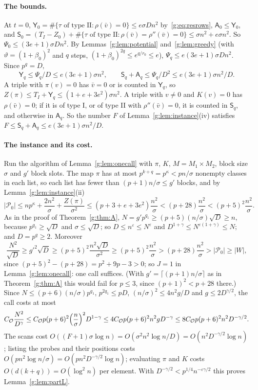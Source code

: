 \documentclass[11pt]{article}
\theoremstyle{definition}
\theoremstyle{remark}
\newcommand{\eps}{\varepsilon}
\newcommand{\Pq}{\mathcal{P}}
\begin{document}
\paragraph{The bounds.} At $t=0$, $\mathsf Y_0=\#\{\tau\text{ of type II}:\rho(\bar v)=0\}\le e\sigma Dn^2$ by~\eqref{g:eq:resrows}, $\mathsf A_0\le\mathsf Y_0$, and $\mathsf S_0=(T_I-Z_0)+\#\{\tau\text{ of type II}:\rho(\bar v)=\rho''(\bar v)=0\}\le\sigma n^2+e\sigma n^2$. So $\Psi_0\le(3e+1)\sigma Dn^2$. By Lemmas~\ref{g:lem:potential} and~\ref{g:lem:greedy} (with $\vartheta=(1+\beta_0)^2$ and $q$ steps, $(1+\beta_0)^{2q}\le e^{q/r_0}\le e$), $\Psi_q\le e(3e+1)\sigma Dn^2$. Since $p^q=D$,
\[
\mathsf Y_q\le\Psi_q/D\le e(3e+1)\sigma n^2,\qquad\mathsf S_q+\mathsf A_q\le\Psi_q/D^2\le e(3e+1)\sigma n^2/D .
\]
A triple with $\pi(v)=0$ has $\bar v=0$ or is counted in $\mathsf Y_q$, so $Z(\pi)\le T_I+\mathsf Y_q\le(1+e+3e^2)\sigma n^2$. A triple with $v\ne0$ and $K(v)=0$ has $\rho(\bar v)=0$; if it is of type I, or of type II with $\rho''(\bar v)=0$, it is counted in $\mathsf S_q$, and otherwise in $\mathsf A_q$. So the number $F$ of Lemma~\ref{g:lem:instance}(iv) satisfies $F\le\mathsf S_q+\mathsf A_q\le e(3e+1)\sigma n^2/D$.

\paragraph{The instance and its cost.} Run the algorithm of Lemma~\ref{g:lem:onecall} with $\pi$, $K$, $M=M_1\times M_2$, block size $\sigma$ and $g'$ block slots. The map $\pi$ has at most $p^{k+q}=p^\kappa<pn/\sigma$ nonempty classes in each list, so each list has fewer than $(p+1)n/\sigma\le g'$ blocks, and by Lemma~\ref{g:lem:instance}(ii)
\[
|\Pq_0|\le np^\kappa+\frac{2n^2}\sigma+\frac{Z(\pi)}{\sigma^2}\le(p+3+e+3e^2)\frac{n^2}\sigma<(p+28)\frac{n^2}\sigma<(p+5)^2\frac{n^2}\sigma .
\]
As in the proof of Theorem~\ref{g:thm:A}, $N=g'p^{q_1}\ge(p+5)(n/\sigma)\sqrt D\ge n$, because $p^{q_1}\ge\sqrt D$ and $\sigma\le\sqrt D$; so $D\le n^\eps\le N^\eps$ and $D^{1+\gamma}\le N^{\eps(1+\gamma)}\le N$; and $D=p^q\ge2$. Moreover
\[
\frac{N^2}{\sqrt D}\ge g'^2\sqrt D\ge(p+5)^2\frac{n^2\sqrt D}{\sigma^2}\ge(p+5)^2\frac{n^2}\sigma>(p+28)\frac{n^2}\sigma>|\Pq_0|\ge|W|,
\]
since $(p+5)^2-(p+28)=p^2+9p-3>0$; so $J=1$ in Lemma~\ref{g:lem:onecall}: one call suffices. (With $g'=\lceil(p+1)n/\sigma\rceil$ as in Theorem~\ref{g:thm:A} this would fail for $p\le3$, since $(p+1)^2<p+28$ there.) Since $N\le(p+6)(n/\sigma)p^{q_1}$, $p^{2q_1}\le pD$, $(n/\sigma)^2\le4n^2g/D$ and $g\le2D^{\gamma/2}$, the call costs at most
\[
C_{\mathcal O}\frac{N^2}{D^\gamma}\le C_{\mathcal O}p(p+6)^2\Bigl(\frac n\sigma\Bigr)^2D^{1-\gamma}\le4C_{\mathcal O}p(p+6)^2n^2gD^{-\gamma}\le8C_{\mathcal O}p(p+6)^2n^2D^{-\gamma/2}.
\] The scans cost $O((F+1)\sigma\log n)=O(\sigma^2n^2\log n/D)=O(n^2D^{-\gamma/2}\log n)$; listing the probes and their positions costs $O(pn^2\log n/\sigma)=O(pn^2D^{-\gamma/2}\log n)$; evaluating $\pi$ and $K$ costs $O(d(k+q))=O(\log^2n)$ per element. With $D^{-\gamma/2}<p^{1/4}n^{-\eps\gamma/2}$ this proves Lemma~\ref{g:lem:partL}.
\end{document}
